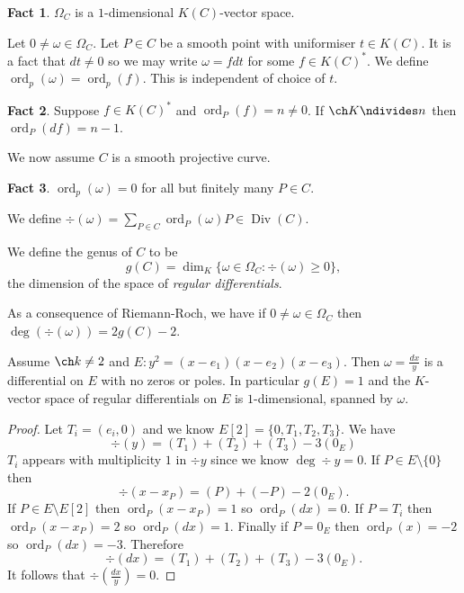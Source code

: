 \documentclass[a4paper]{article}
\theoremstyle{definition}
\newtheorem*{fact}{Fact}
\DeclareMathOperator{\ord}{ord}
\DeclareMathOperator{\Div}{Div} %
\begin{document}
\begin{fact}
  \(\Omega_C\) is a \(1\)-dimensional \(K(C)\)-vector space.
\end{fact}

Let \(0 \neq \omega \in \Omega_C\). Let \(P \in C\) be a smooth point with uniformiser \(t \in K(C)\). It is a fact that \(dt \neq 0\) so we may write \(\omega = f dt\) for some \(f \in K(C)^*\). We define \(\ord_p(\omega) = \ord_p(f)\). This is independent of choice of \(t\).

\begin{fact}
  Suppose \(f \in K(C)^*\) and \(\ord_P(f) = n \neq 0\). If \(\ch K \ndivides n\) then \(\ord_P(df) = n - 1\).
\end{fact}

We now assume \(C\) is a smooth projective curve.

\begin{fact}
  \(\ord_p(\omega) = 0\) for all but finitely many \(P \in C\).
\end{fact}

\begin{definition}
  We define \(\div(\omega) = \sum_{P \in C} \ord_P(\omega) P \in \Div(C)\).
\end{definition}

\begin{definition}
  We define the genus of \(C\) to be
  \[
    g(C) = \dim_K \{\omega \in \Omega_C: \div(\omega) \geq 0\},
  \]
  the dimension of the space of \emph{regular differentials}.
\end{definition}

As a consequence of Riemann-Roch, we have if \(0 \neq \omega \in \Omega_C\) then \(\deg(\div(\omega)) = 2 g(C) - 2\).

\begin{lemma}
  Assume \(\ch k \neq 2\) and \(E: y^2 = (x - e_1)(x - e_2)(x - e_3)\). Then \(\omega = \frac{dx}{y}\) is a differential on \(E\) with no zeros or poles. In particular \(g(E) = 1\) and the \(K\)-vector space of regular differentials on \(E\) is \(1\)-dimensional, spanned by \(\omega\).
\end{lemma}

\begin{proof}
  Let \(T_i = (e_i, 0)\) and we know \(E[2] = \{0, T_1, T_2, T_3\}\). We have
  \[
    \div (y) = (T_1) + (T_2) + (T_3) - 3(0_E)
  \]
  \(T_i\) appears with multiplicity \(1\) in \(\div y\) since we know \(\deg \div y = 0\). If \(P \in E \setminus \{0\}\) then
  \[
    \div (x - x_P) = (P) + (-P) - 2(0_E).
  \]
  If \(P \in E \setminus E[2]\) then \(\ord_P(x - x_P) = 1\) so \(\ord_P(dx) = 0\). If \(P = T_i\) then \(\ord_P(x - x_P) = 2\) so \(\ord_P(dx) = 1\). Finally if \(P = 0_E\) then \(\ord_P(x) = -2\) so \(\ord_P(dx) = -3\). Therefore
  \[
    \div(dx) = (T_1) + (T_2) + (T_3) - 3(0_E).
  \]
  It follows that \(\div (\frac{dx}{y}) = 0\).
\end{proof}
\end{document}
